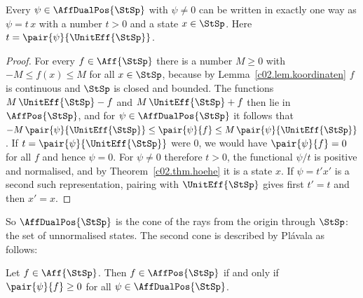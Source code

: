 \begin{vertiefung}
  \begin{lemma}\label{c02.lem.basis}
    Every $\psi \in \AffDualPos{\StSp}$ with $\psi \neq 0$ can be written in exactly one
    way as $\psi = t\, x$ with a number $t > 0$ and a state $x \in \StSp$. Here
    $t = \pair{\psi}{\UnitEff{\StSp}}$.
  \end{lemma}
  \begin{proof}
    For every $f \in \Aff{\StSp}$ there is a number $M \geq 0$ with
    $-M \leq f(x) \leq M$ for all $x \in \StSp$, because by
    Lemma~\ref{c02.lem.koordinaten} $f$ is continuous and $\StSp$ is closed and bounded.
    The functions $M\,\UnitEff{\StSp} - f$ and $M\,\UnitEff{\StSp} + f$ then lie in
    $\AffPos{\StSp}$, and for $\psi \in \AffDualPos{\StSp}$ it follows that
    $-M\, \pair{\psi}{\UnitEff{\StSp}} \leq \pair{\psi}{f} \leq M\, \pair{\psi}{\UnitEff{\StSp}}$.
    If $t = \pair{\psi}{\UnitEff{\StSp}}$ were $0$, we would have $\pair{\psi}{f} = 0$ for
    all $f$ and hence $\psi = 0$. For $\psi \neq 0$ therefore $t > 0$, the functional
    $\psi / t$ is positive and normalised, and by Theorem~\ref{c02.thm.hoehe} it is a state
    $x$. If $\psi = t' x'$ is a second such representation, pairing with $\UnitEff{\StSp}$
    gives first $t' = t$ and then $x' = x$.
  \end{proof}

  So $\AffDualPos{\StSp}$ is the cone of the rays from the origin through $\StSp$: the set
  of unnormalised states. The second cone is described by Plávala as follows:

  \begin{lemma}\label{c02.lem.dualkegel}
    Let $f \in \Aff{\StSp}$. Then $f \in \AffPos{\StSp}$ if and only if
    $\pair{\psi}{f} \geq 0$ for all $\psi \in \AffDualPos{\StSp}$.
  \end{lemma}


\end{vertiefung}
